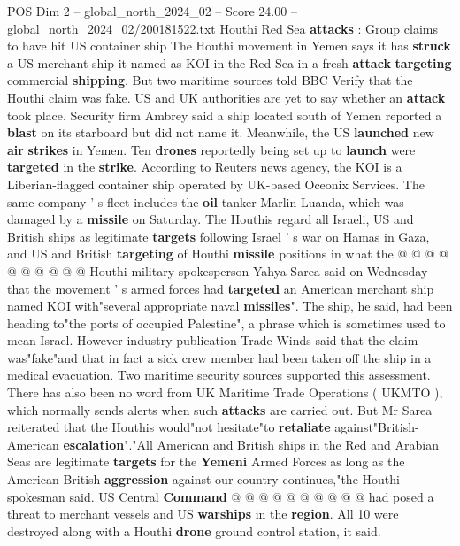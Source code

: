 \begin{textsample}{POS Dim 2 – global\_north\_2024\_02 – Score 24.00 – global\_north\_2024\_02/200181522.txt}  \label{ex:f2_pos_270}
Houthi Red Sea \textbf{attacks} : Group claims to have hit US container ship The Houthi movement in Yemen says it has \textbf{struck} a US merchant ship it named as KOI in the Red Sea in a fresh \textbf{attack} \textbf{targeting} commercial \textbf{shipping}.
But two maritime sources told BBC Verify that the Houthi claim was fake.
US and UK authorities are yet to say whether an \textbf{attack} took place.
Security firm Ambrey said a ship located south of Yemen reported a \textbf{blast} on its starboard but did not name it.
Meanwhile, the US \textbf{launched} new \textbf{air} \textbf{strikes} in Yemen.
Ten \textbf{drones} reportedly being set up to \textbf{launch} were \textbf{targeted} in the \textbf{strike}.
According to Reuters news agency, the KOI is a Liberian-flagged container ship operated by UK-based Oceonix Services.
The same company ' s fleet includes the \textbf{oil} tanker Marlin Luanda, which was damaged by a \textbf{missile} on Saturday.
The Houthis regard all Israeli, US and British ships as legitimate \textbf{targets} following Israel ' s war on Hamas in Gaza, and US and British \textbf{targeting} of Houthi \textbf{missile} positions in what the @ @ @ @ @ @ @ @ @ @ Houthi military spokesperson Yahya Sarea said on Wednesday that the movement ' s armed forces had \textbf{targeted} an American merchant ship named KOI with"several appropriate naval \textbf{missiles}".
The ship, he said, had been heading to"the ports of occupied Palestine", a phrase which is sometimes used to mean Israel.
However industry publication Trade Winds said that the claim was"fake"and that in fact a sick crew member had been taken off the ship in a medical evacuation.
Two maritime security sources supported this assessment.
There has also been no word from UK Maritime Trade Operations ( UKMTO ), which normally sends alerts when such \textbf{attacks} are carried out.
But Mr Sarea reiterated that the Houthis would"not hesitate"to \textbf{retaliate} against"British-American \textbf{escalation}"."All American and British ships in the Red and Arabian Seas are legitimate \textbf{targets} for the \textbf{Yemeni} Armed Forces as long as the American-British \textbf{aggression} against our country continues,"the Houthi spokesman said.
US Central \textbf{Command} @ @ @ @ @ @ @ @ @ @ had posed a threat to merchant vessels and US \textbf{warships} in the \textbf{region}.
All 10 were destroyed along with a Houthi \textbf{drone} ground control station, it said.

\end{textsample}
